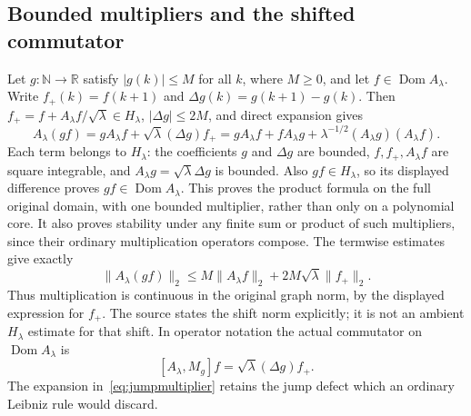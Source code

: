 \documentclass[11pt]{article}
\newcommand{\R}{\mathbb R}\newcommand{\N}{\mathbb N}
\newcommand{\Dom}{\operatorname{Dom}}
\begin{document}
\subsection*{Bounded multipliers and the shifted commutator}
Let $g:\N\to\R$ satisfy $|g(k)|\leq M$ for all $k$, where
$M\geq0$, and let $f\in\Dom A_\lambda$. Write
$f_+(k)=f(k+1)$ and $\Delta g(k)=g(k+1)-g(k)$.
Then $f_+=f+A_\lambda f/\sqrt\lambda\in H_\lambda$,
$|\Delta g|\leq2M$, and direct expansion gives
\begin{equation}\label{eq:jumpmultiplier}
 A_\lambda(gf)=gA_\lambda f+\sqrt\lambda(\Delta g)f_+
 =gA_\lambda f+fA_\lambda g+
      \lambda^{-1/2}(A_\lambda g)(A_\lambda f).
\end{equation}
Each term belongs to $H_\lambda$: the coefficients $g$ and
$\Delta g$ are bounded, $f,f_+,A_\lambda f$ are square integrable,
and $A_\lambda g=\sqrt\lambda\Delta g$ is bounded.
Also $gf\in H_\lambda$, so its displayed difference proves
$gf\in\Dom A_\lambda$. This proves the product formula on the
full original domain, with one bounded multiplier, rather than only
on a polynomial core. It also proves stability under any finite sum or
product of such multipliers, since their ordinary multiplication
operators compose. The termwise estimates give exactly
\begin{equation}\label{eq:shiftgraphbound}
 \|A_\lambda(gf)\|_2\leq M\|A_\lambda f\|_2
                 +2M\sqrt\lambda\|f_+\|_2.
\end{equation}
Thus multiplication is continuous in the original graph norm, by the
displayed expression for $f_+$. The source states the shift norm
explicitly; it is not an ambient $H_\lambda$ estimate for that shift.
In operator notation the actual commutator on $\Dom A_\lambda$ is
\[
 [A_\lambda,M_g]f=\sqrt\lambda(\Delta g)f_+.
\]
The expansion in~\eqref{eq:jumpmultiplier} retains the jump defect
which an ordinary Leibniz rule would discard.
\end{document}
